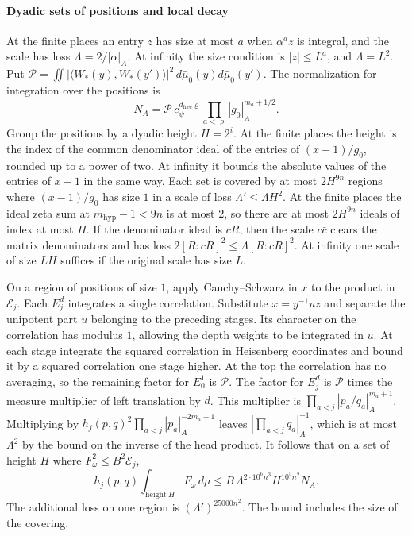 \paragraph{Dyadic sets of positions and local decay}\label{par:span-local-decay}
At the finite places an entry \(z\) has size at most \(a\) when
\(\alpha^a z\) is integral, and the scale has loss \(\Lambda=2/|\alpha|_A\).
At infinity the size condition is \(|z|\le L^a\), and \(\Lambda=L^2\).
Put \(\mathcal P=\iint|\langle W_\ast(y),W_\ast(y')\rangle|^2
\,d\bar\mu_0(y)d\bar\mu_0(y')\). The normalization for integration
over the positions is
\[
 N_A=\mathcal P\,c_\psi^{d_{\mathrm{free}}\varrho}
                    \prod_{a<\varrho}|g_0|_A^{m_a+1/2}.
\]
Group the positions by a dyadic height \(H=2^i\). At the finite places
the height is the index of the common denominator ideal of the entries
of \((x-1)/g_0\), rounded up to a power of two. At infinity it bounds
the absolute values of the entries of \(x-1\) in the same way.
Each set is covered by at most \(2H^{9n}\) regions where
\((x-1)/g_0\) has size \(1\) in a scale of loss \(\Lambda'\le\Lambda H^2\).
At the finite places the ideal zeta sum at \(m_\mathrm{hyp}-1<9n\)
is at most \(2\), so there are at most \(2H^{9n}\) ideals of index
at most \(H\). If the denominator ideal is \(cR\), then the scale
\(c\bar c\) clears the matrix denominators and has loss
\(2[R:cR]^2\le\Lambda[R:cR]^2\). At infinity one scale of size \(LH\)
suffices if the original scale has size \(L\).

On a region of positions of size \(1\), apply Cauchy--Schwarz in \(x\)
to the product in \(\mathcal E_j\). Each \(E_j^d\) integrates a single
correlation. Substitute \(x=y^{-1}u z\) and separate the unipotent
part \(u\) belonging to the preceding stages. Its character on the
correlation has modulus \(1\), allowing the depth weights to be
integrated in \(u\). At each stage integrate the squared correlation
in Heisenberg coordinates and bound it by a squared correlation one
stage higher. At the top the correlation has no averaging, so the
remaining factor for \(E_0^1\) is \(\mathcal P\). The factor for
\(E_j^d\) is \(\mathcal P\) times the measure multiplier of left
translation by \(d\). This multiplier is
\(\prod_{a<j}|p_a/q_a|_A^{m_a+1}\).
Multiplying by \(h_j(p,q)^2\prod_{a<j}|p_a|_A^{-2m_a-1}\) leaves
\(|\prod_{a<j}q_a|_A^{-1}\), which is at most \(\Lambda^2\) by the bound
on the inverse of the head product. It follows that on a set of height
\(H\) where \(F_\omega^2\le B^2\mathcal E_j\),
\[
 h_j(p,q)\int_{\mathrm{height}\ H} F_\omega\,d\mu
 \le B\,\Lambda^{2\cdot10^6 n^3}H^{10^5n^2}N_A .
\]
The additional loss on one region is \((\Lambda')^{25000n^2}\).
The bound includes the size of the covering.


